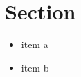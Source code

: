 \MDNAME

\section{Section}

\begin{itemize}
  \item
      item a
  \item
     item b
\end{itemize}

